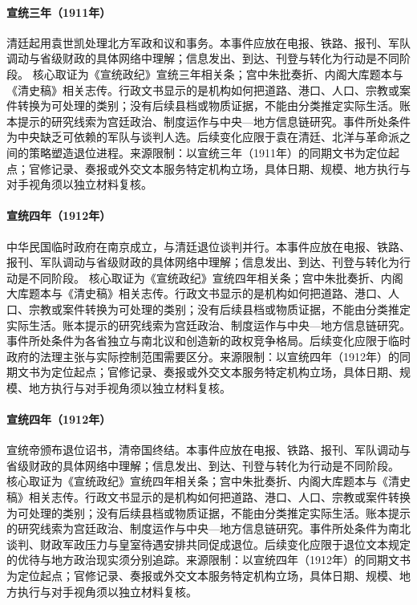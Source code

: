 \hypertarget{civic:EQ-1911-YUAN-SHIKAI-RETURN}{}\paragraph{宣统三年（1911年）}清廷起用袁世凯处理北方军政和议和事务。本事件应放在电报、铁路、报刊、军队调动与省级财政的具体网络中理解；信息发出、到达、刊登与转化为行动是不同阶段。 核心取证为《宣统政纪》宣统三年相关条；宫中朱批奏折、内阁大库题本与《清史稿》相关志传。行政文书显示的是机构如何把道路、港口、人口、宗教或案件转换为可处理的类别；没有后续县档或物质证据，不能由分类推定实际生活。账本提示的研究线索为宫廷政治、制度运作与中央—地方信息链研究。事件所处条件为中央缺乏可依赖的军队与谈判人选。后续变化应限于袁在清廷、北洋与革命派之间的策略塑造退位进程。来源限制：以宣统三年（1911年）的同期文书为定位起点；官修记录、奏报或外交文本服务特定机构立场，具体日期、规模、地方执行与对手视角须以独立材料复核。
\hypertarget{civic:EQ-1912-REPUBLIC-FOUNDING}{}\paragraph{宣统四年（1912年）}中华民国临时政府在南京成立，与清廷退位谈判并行。本事件应放在电报、铁路、报刊、军队调动与省级财政的具体网络中理解；信息发出、到达、刊登与转化为行动是不同阶段。 核心取证为《宣统政纪》宣统四年相关条；宫中朱批奏折、内阁大库题本与《清史稿》相关志传。行政文书显示的是机构如何把道路、港口、人口、宗教或案件转换为可处理的类别；没有后续县档或物质证据，不能由分类推定实际生活。账本提示的研究线索为宫廷政治、制度运作与中央—地方信息链研究。事件所处条件为各省独立与南北议和创造新的政权竞争格局。后续变化应限于临时政府的法理主张与实际控制范围需要区分。来源限制：以宣统四年（1912年）的同期文书为定位起点；官修记录、奏报或外交文本服务特定机构立场，具体日期、规模、地方执行与对手视角须以独立材料复核。
\hypertarget{civic:EQ-1912-QING-ABDICATION}{}\paragraph{宣统四年（1912年）}宣统帝颁布退位诏书，清帝国终结。本事件应放在电报、铁路、报刊、军队调动与省级财政的具体网络中理解；信息发出、到达、刊登与转化为行动是不同阶段。 核心取证为《宣统政纪》宣统四年相关条；宫中朱批奏折、内阁大库题本与《清史稿》相关志传。行政文书显示的是机构如何把道路、港口、人口、宗教或案件转换为可处理的类别；没有后续县档或物质证据，不能由分类推定实际生活。账本提示的研究线索为宫廷政治、制度运作与中央—地方信息链研究。事件所处条件为南北谈判、财政军政压力与皇室待遇安排共同促成退位。后续变化应限于退位文本规定的优待与地方政治现实须分别追踪。来源限制：以宣统四年（1912年）的同期文书为定位起点；官修记录、奏报或外交文本服务特定机构立场，具体日期、规模、地方执行与对手视角须以独立材料复核。
